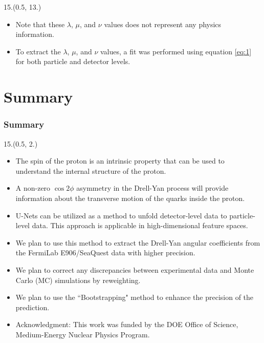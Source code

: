 \documentclass[12pt, xcolor={dvipsnames}, aspectratio = 169, sans, mathserif]{beamer}
\newenvironment{List}[2]
{\begin{textblock}{#1}#2
\begin{itemize}}
{\end{itemize}
\end{textblock}}
\begin{document}
\begin{frame}
\begin{scriptsize}
\begin{List}{15.}{(0.5, 13.)}
  \item Note that these $\lambda$, $\mu$, and $\nu$ values does not represent any physics information.

  \item To extract the $\lambda$, $\mu$, and $\nu$ values, a fit was performed using equation \ref{eq:1} for both particle and detector levels.
\end{List}
\end{scriptsize}

\end{frame}

\section{Summary}

\begin{frame}
\frametitle{Summary}

\begin{List}{15.}{(0.5, 2.)}

  \item The spin of the proton is an intrinsic property that can be used to understand the internal structure of the proton.

  \item A non-zero $\cos2\phi$ asymmetry in the Drell-Yan process will provide information about the transverse motion of the quarks inside the proton.

  \item U-Nets can be utilized as a method to unfold detector-level data to particle-level data. This approach is applicable in high-dimensional feature spaces.

  \item We plan to use this method to extract the Drell-Yan angular coefficients from the FermiLab E906/SeaQuest data with higher  precision.

  \item We plan to correct any discrepancies between experimental data and Monte Carlo (MC) simulations by reweighting.

  \item We plan to use the ``Bootstrapping" method to enhance the precision of the prediction.

  \item Acknowledgment: This work was funded by the DOE Office of Science, Medium-Energy Nuclear Physics Program.

\end{List}

\end{frame}
\end{document}
